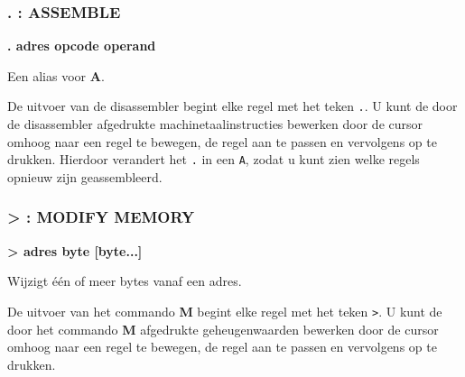 
\subsubsection{. : ASSEMBLE}
\begin{description}[leftmargin=2cm,style=nextline]
\item [Formaat:] {\bf . adres opcode operand}\item [Gebruik:] Een alias voor {\bf A}.

\item [Opmerkingen:] De uitvoer van de disassembler begint elke regel met het teken {\tt .}. U kunt de door de disassembler afgedrukte machinetaalinstructies bewerken door de cursor omhoog naar een regel te bewegen, de regel aan te passen en vervolgens op  te drukken. Hierdoor verandert het {\tt .} in een {\tt A}, zodat u kunt zien welke regels opnieuw zijn geassembleerd.

\end{description}


\subsubsection{> : MODIFY MEMORY}
\begin{description}[leftmargin=2cm,style=nextline]
\item [Formaat:] {\bf > adres byte [byte...]}\item [Gebruik:] Wijzigt één of meer bytes vanaf een adres.

\item [Opmerkingen:] De uitvoer van het commando {\bf M} begint elke regel met het teken {\tt >}. U kunt de door het commando {\bf M} afgedrukte geheugenwaarden bewerken door de cursor omhoog naar een regel te bewegen, de regel aan te passen en vervolgens op  te drukken.

\end{description}



